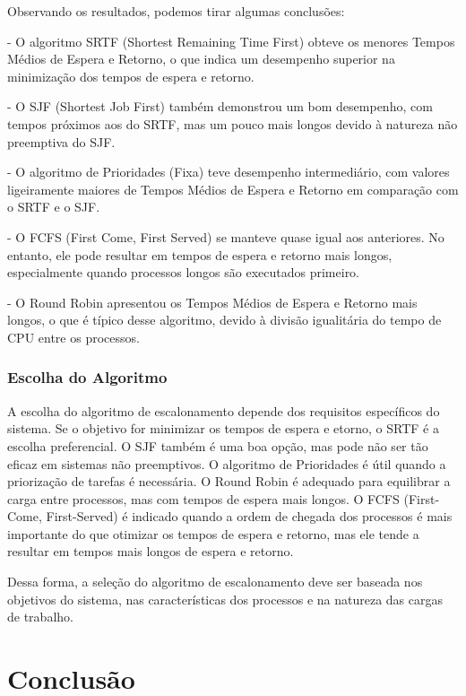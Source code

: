 \documentclass[
	12pt,				%
	openright,			%
	oneside,			%
	a4paper,			%
	chapter=TITLE,		%
	english,			%
	french,				%
	spanish,			%
	brazil				%
	]{abntex2}
\theoremstyle{definition}
\begin{document}
Observando os resultados, podemos tirar algumas conclusões:

- O algoritmo SRTF (Shortest Remaining Time First) obteve os menores Tempos Médios de Espera e Retorno, o que indica um desempenho superior na minimização dos tempos de espera e retorno.

- O SJF (Shortest Job First) também demonstrou um bom desempenho, com tempos próximos aos do SRTF, mas um pouco mais longos devido à natureza não preemptiva do SJF.

- O algoritmo de Prioridades (Fixa) teve desempenho intermediário, com valores ligeiramente maiores de Tempos Médios de Espera e Retorno em comparação com o SRTF e o SJF.

- O FCFS (First Come, First Served) se manteve quase igual aos anteriores. No entanto, ele pode resultar em tempos de espera e retorno mais longos, especialmente quando processos longos são executados primeiro.

- O Round Robin apresentou os Tempos Médios de Espera e Retorno mais longos, o que é típico desse algoritmo, devido à divisão igualitária do tempo de CPU entre os processos.

\subsection{Escolha do Algoritmo}

A escolha do algoritmo de escalonamento depende dos requisitos específicos do sistema. Se o objetivo for minimizar os tempos de espera e 
etorno, o SRTF é a escolha preferencial. O SJF também é uma boa opção, mas pode não ser tão eficaz em sistemas não preemptivos. O algoritmo 
de Prioridades é útil quando a priorização de tarefas é necessária. O Round Robin é adequado para equilibrar a carga entre processos, mas com 
tempos de espera mais longos. O FCFS (First-Come, First-Served) é indicado quando a ordem de chegada dos processos é mais importante do que 
otimizar os tempos de espera e retorno, mas ele tende a resultar em tempos mais longos de espera e retorno.

Dessa forma, a seleção do algoritmo de escalonamento deve ser baseada nos objetivos do sistema, nas características dos processos e na natureza das cargas de trabalho.
    

\chapter{Conclusão}
\label{conclusao}
\end{document}
